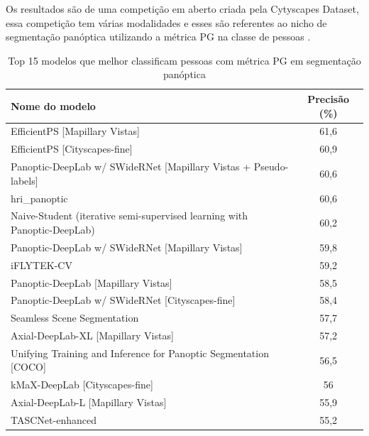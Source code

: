 Os resultados são de uma competição em aberto criada pela Cytyscapes Dataset, essa competição tem várias modalidades e esses são referentes ao nicho de segmentação panóptica utilizando a métrica PG na classe de pessoas \cite{datasetResults}.
\begin{table}[H]
	\centering
	\caption{Top 15 modelos que melhor classificam pessoas com métrica PG em segmentação panóptica}
	\label{tab:resultados-cityscapes}
	\begin{tabular}{|l|c|}
	  \hline
	  Nome do modelo & Precisão (\%) \\
	  \hline
	  EfficientPS [Mapillary Vistas] & 61,6 \\
	  EfficientPS [Cityscapes-fine] & 60,9 \\
	  Panoptic-DeepLab w/ SWideRNet [Mapillary Vistas + Pseudo-labels] & 60,6 \\
	  hri\_panoptic & 60,6 \\
	  Naive-Student (iterative semi-supervised learning with Panoptic-DeepLab) & 60,2 \\
	  Panoptic-DeepLab w/ SWideRNet [Mapillary Vistas] & 59,8 \\
	  iFLYTEK-CV & 59,2 \\
	  Panoptic-DeepLab [Mapillary Vistas] & 58,5 \\
	  Panoptic-DeepLab w/ SWideRNet [Cityscapes-fine] & 58,4 \\
	  Seamless Scene Segmentation & 57,7 \\
	  Axial-DeepLab-XL [Mapillary Vistas] & 57,2 \\
	  Unifying Training and Inference for Panoptic Segmentation [COCO] & 56,5 \\
	  kMaX-DeepLab [Cityscapes-fine] & 56 \\
	  Axial-DeepLab-L [Mapillary Vistas] & 55,9 \\
	  TASCNet-enhanced & 55,2 \\
	  \hline
	\end{tabular}
  \end{table}
  
  


